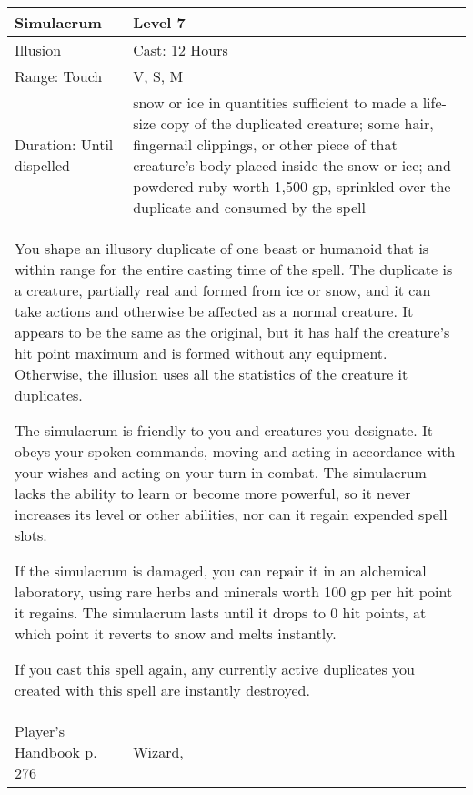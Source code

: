 \documentclass[11pt]{report}
\begin{document}
\begin{table}[H]
	\begin{tabular}{||p{6cm}|p{6cm}||}
		\hline\hline
		\bf{Simulacrum} & Level 7\\ \hline
		Illusion & Cast: 12 Hours\\ \hline
		Range: Touch & V, S, M\\ \hline
		Duration: Until dispelled & snow or ice in quantities sufficient to made a life-size copy of the duplicated creature; some hair, fingernail clippings, or other piece of that creature’s body placed inside the snow or ice; and powdered ruby worth 1,500 gp, sprinkled over the duplicate and consumed by the spell\\ \hline
		\multicolumn{2}{||p{12cm}||}{You shape an illusory duplicate of one beast or humanoid that is within range for the entire casting time of the spell.
The duplicate is a creature, partially real and formed from ice or snow, and it can take actions and otherwise be affected as a normal creature. It appears to be the same as the original, but it has half the creature’s hit point maximum and is formed without any equipment. Otherwise, the illusion uses all the statistics of the creature it duplicates.

The simulacrum is friendly to you and creatures you designate. It obeys your spoken commands, moving and acting in accordance with your wishes and acting on your turn in combat. The simulacrum lacks the ability to learn or become more powerful, so it never increases its level or other abilities, nor can it regain expended spell slots.

If the simulacrum is damaged, you can repair it in an alchemical laboratory, using rare herbs and minerals worth 100 gp per hit point it regains. The simulacrum lasts until it drops to 0 hit points, at which point it reverts to snow and melts instantly.

If you cast this spell again, any currently active duplicates you created with this spell are instantly destroyed.}\\ \hline
Player's Handbook p. 276 & Wizard, \\ \hline\hline
	\end{tabular}
\end{table}
\end{document}
